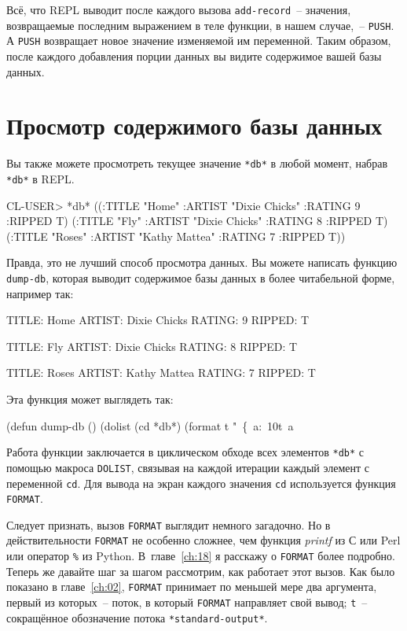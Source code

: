 Всё, что REPL выводит после каждого вызова \lstinline{add-record}~-- значения, возвращаемые
последним выражением в теле функции, в нашем случае,~-- \lstinline{PUSH}. А \lstinline{PUSH}
возвращает новое значение изменяемой им переменной. Таким образом, после каждого
добавления порции данных вы видите содержимое вашей базы данных.

\section{Просмотр содержимого базы данных}

Вы также можете просмотреть текущее значение \lstinline{*db*} в любой момент,
набрав \lstinline{*db*} в REPL.

\begin{myverb}
CL-USER> *db*
((:TITLE "Home" :ARTIST "Dixie Chicks" :RATING 9 :RIPPED T)
 (:TITLE "Fly" :ARTIST "Dixie Chicks" :RATING 8 :RIPPED T)
 (:TITLE "Roses" :ARTIST "Kathy Mattea" :RATING 7 :RIPPED T))
\end{myverb}

Правда, это не лучший способ просмотра данных. Вы можете написать функцию \lstinline{dump-db},
которая выводит содержимое базы данных в более читабельной форме, например так:

\begin{myverb}
   TITLE:    Home
   ARTIST:   Dixie Chicks
   RATING:   9
   RIPPED:   T
   
   TITLE:    Fly
   ARTIST:   Dixie Chicks
   RATING:   8
   RIPPED:   T
   
   TITLE:    Roses
   ARTIST:   Kathy Mattea
   RATING:   7
   RIPPED:   T
\end{myverb}

Эта функция может выглядеть так:

\begin{myverb}
(defun dump-db ()
  (dolist (cd *db*)
    (format t "~\{~a:~10t~a~%
\end{myverb}

Работа функции заключается в циклическом обходе всех элементов \lstinline{*db*} с помощью макроса
\lstinline{DOLIST}, связывая на каждой итерации каждый элемент с переменной \lstinline{cd}. Для
вывода на экран каждого значения \lstinline{cd} используется функция \lstinline{FORMAT}.

Следует признать, вызов \lstinline{FORMAT} выглядит немного загадочно. Но в действительности
\lstinline{FORMAT} не особенно сложнее, чем функция \textit{printf} из С или
Perl или оператор \lstinline{%} из Python. В~главе~\ref{ch:18} я расскажу о
\lstinline{FORMAT} более подробно. Теперь же давайте шаг за шагом рассмотрим, как работает этот
вызов. Как было показано в главе~\ref{ch:02}, \lstinline{FORMAT} принимает по меньшей мере два аргумента,
первый из которых~-- поток, в который \lstinline{FORMAT} направляет свой вывод; \lstinline{t}~--
сокращённое обозначение потока \lstinline{*standard-output*}.

